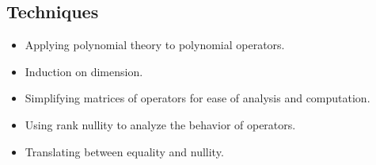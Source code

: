 \subsection*{Techniques}
\begin{itemize}[itemsep=0pt]
\item Applying polynomial theory to polynomial operators.
\item Induction on dimension.
\item Simplifying matrices of operators for ease of analysis and computation.
\item Using rank nullity to analyze the behavior of operators.
\item Translating between equality and nullity.
\end{itemize}
